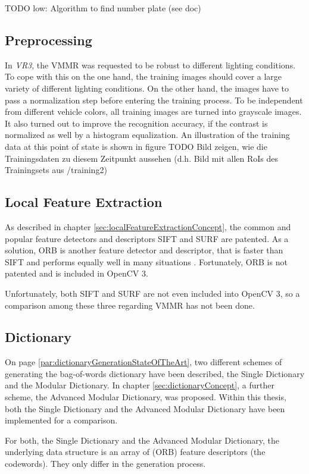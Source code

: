TODO low: Algorithm to find number plate (see doc)

\subsection{Preprocessing}\label{sec:preprocessingImpl}
In \emph{VR3}, the VMMR was requested to be robust to different lighting conditions. To cope with this on the one hand, the training images should cover a large variety of different lighting conditions. On the other hand, the images have to pass a normalization step before entering the training process. To be independent from different vehicle colors, all training images are turned into grayscale images. It also turned out to improve the recognition accuracy, if the contrast is normalized as well by a histogram equalization. An illustration of the training data at this point of state is shown in figure TODO Bild zeigen, wie die Trainingsdaten zu diesem Zeitpunkt aussehen (d.h. Bild mit allen RoIs des Trainingsets aus /training2)

\subsection{Local Feature Extraction}\label{sec:localFeatureExtractionImpl}
As described in chapter \ref{sec:localFeatureExtractionConcept}, the common and popular feature detectors and descriptors SIFT and SURF are patented. As a solution, ORB is another feature detector and descriptor, that is faster than SIFT and performs equally well in many situations \citep{rublee2011orb}. Fortunately, ORB is not patented and is included in OpenCV 3.

Unfortunately, both SIFT and SURF are not even included into OpenCV 3, so a comparison among these three regarding VMMR has not been done.

\subsection{Dictionary}\label{sec:dictionaryImpl}
On page \ref{par:dictionaryGenerationStateOfTheArt}, two different schemes of generating the bag-of-words dictionary have been described, the Single Dictionary and the Modular Dictionary. In chapter \ref{sec:dictionaryConcept}, a further scheme, the Advanced Modular Dictionary, was proposed. Within this thesis, both the Single Dictionary and the Advanced Modular Dictionary have been implemented for a comparison.

For both, the Single Dictionary and the Advanced Modular Dictionary, the underlying data structure is an array of (ORB) feature descriptors (the codewords). They only differ in the generation process.

